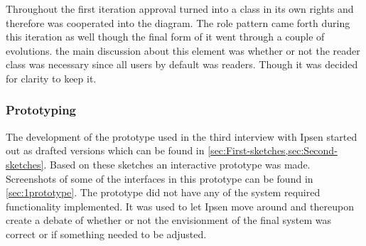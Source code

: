 Throughout the first iteration approval turned into a class in its own rights and therefore was cooperated into the diagram.
The role pattern came forth during this iteration as well though the final form of it went through a couple of evolutions.
the main discussion about this element was whether or not the reader class was necessary since all users by default was readers. 
Though it was decided for clarity to keep it.

\subsubsection*{Prototyping}
The development of the prototype used in the third interview with Ipsen started out as drafted versions which can be found in \cref{sec:First-sketches,sec:Second-sketches}.
Based on these sketches an interactive prototype was made. 
Screenshots of some of the interfaces in this prototype can be found in \cref{sec:1prototype}.
The prototype did not have any of the system required functionality implemented.
It was used to let Ipsen move around and thereupon create a debate of whether or not the envisionment of the final system was correct or if something needed to be adjusted.


